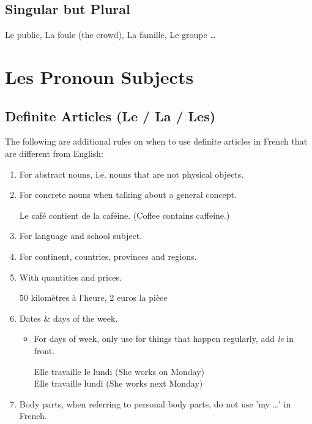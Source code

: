 \documentclass{book}
\begin{document}
    \section{Singular but Plural}
        Le public, La foule (the crowd), La famille, Le groupe \dots

\chapter{Les Pronoun Subjects}

    \section{Definite Articles (Le / La / Les)}
        The following are additional rules on when to use definite articles in French that are different from English:
        \begin{enumerate}
            \item For abstract nouns, i.e. nouns that are not physical objects.
            \item For concrete nouns when talking about a general concept.
            \begin{center}
                Le café contient de la caféine. (Coffee contains caffeine.)
            \end{center}
            \item For language and school subject.
            \item For continent, countries, provinces and regions.
            \item With quantities and prices.
            \begin{center}
                50 kilomètres à l'heure, 2 euros la pièce
            \end{center}
            \item Dates \& days of the week.
                \begin{itemize}
                    \item For days of week, only use for things that happen regularly, add \textit{le} in front.
                    \begin{center}
                        Elle travaille le lundi (She works on Monday) \\
                        Elle travaille lundi (She works next Monday)
                    \end{center}
                \end{itemize}
            \item Body parts, when referring to personal body parts, do not use 'my \dots' in French.

\end{enumerate}
\end{document}
